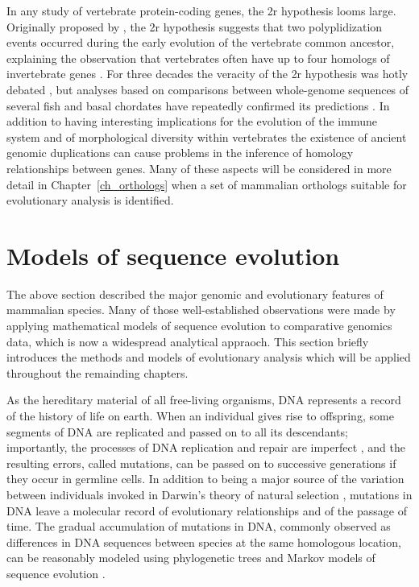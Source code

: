 In any study of vertebrate protein-coding genes, the \ac{2r}
hypothesis looms large. Originally proposed by \citet{Ohno1970}, the
\ac{2r} hypothesis suggests that two polyplidization events occurred
during the early evolution of the vertebrate common ancestor,
explaining the observation that vertebrates often have up to four
homologs of invertebrate genes \citep{Hokamp2003}. For three decades
the veracity of the \ac{2r} hypothesis was hotly debated
\citep{McLysaght2002,Dehal2005}, but analyses based on comparisons
between whole-genome sequences of several fish and basal chordates
have repeatedly confirmed its predictions
\citep{Kasahara2007,Putnam2008b}. In addition to having interesting
implications for the evolution of the immune system and of
morphological diversity within vertebrates
\citep{Hughes1997,Hoffmann1999,Peer2009b} the existence of ancient
genomic duplications can cause problems in the inference of homology
relationships between genes. Many of these aspects will be considered
in more detail in Chapter~\ref{ch_orthologs} when a set of mammalian
orthologs suitable for evolutionary analysis is identified.

\section{Models of sequence evolution}
\label{section_evolution_models}

The above section described the major genomic and evolutionary
features of mammalian species. Many of those well-established
observations were made by applying mathematical models of sequence
evolution to comparative genomics data, which is now a widespread
analytical appraoch. This section briefly introduces the methods and
models of evolutionary analysis which will be applied throughout the
remainding chapters.

As the hereditary material of all free-living organisms, DNA
represents a record of the history of life on earth. When an
individual gives rise to offspring, some segments of DNA are
replicated and passed on to all its descendants; importantly, the
processes of DNA replication and repair are imperfect
\citep{Arnheim2009}, and the resulting errors, called mutations, can
be passed on to successive generations if they occur in germline
cells. In addition to being a major source of the variation between
individuals invoked in Darwin's theory of natural selection
\citep{Darwin1859a}, mutations in DNA leave a molecular record of
evolutionary relationships and of the passage of time. The gradual
accumulation of mutations in DNA, commonly observed as differences in
DNA sequences between species at the same homologous location, can be
reasonably modeled using phylogenetic trees and Markov models of
sequence evolution \citep{Yang2006}.

